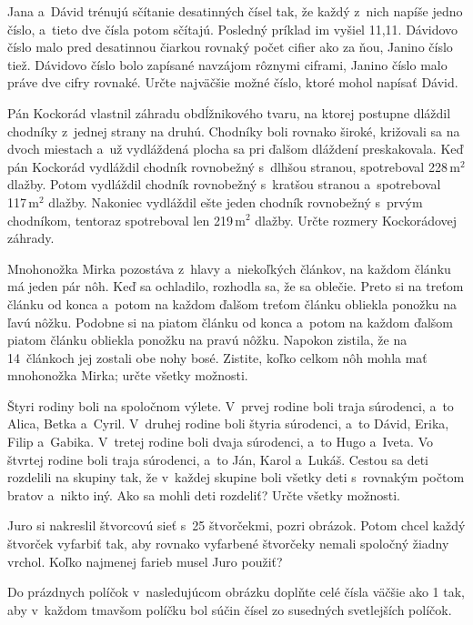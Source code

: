 {%
Jana a~Dávid trénujú sčítanie desatinných čísel tak, že každý z~nich napíše jedno číslo, a~tieto dve čísla potom sčítajú.
Posledný príklad im vyšiel 11{,}11.
Dávidovo číslo malo pred desatinnou čiarkou rovnaký počet cifier ako za ňou, Janino číslo tiež.
Dávidovo číslo bolo zapísané navzájom rôznymi ciframi, Janino číslo malo
práve dve cifry rovnaké.
Určte najväčšie možné číslo, ktoré mohol napísať Dávid.}

{%
Pán Kockorád vlastnil záhradu obdĺžnikového tvaru, na ktorej postupne dláždil chodníky z~jednej strany na druhú.
Chodníky boli rovnako široké, križovali sa na dvoch miestach a~už vydláždená plocha sa pri ďalšom dláždení preskakovala.
Keď pán Kockorád vydláždil chodník rovnobežný s~dlhšou stranou, spotreboval 228\,m$^2$ dlažby.
Potom vydláždil chodník rovnobežný s~kratšou stranou a~spotreboval 117\,m$^2$ dlažby.
Nakoniec vydláždil ešte jeden chodník rovnobežný s~prvým chodníkom, tentoraz spotreboval len 219\,m$^2$ dlažby.
Určte rozmery Kockorádovej záhrady.}

{%
Mnohonožka Mirka pozostáva z~hlavy a~niekoľkých článkov, na každom článku má jeden pár nôh.
Keď sa ochladilo, rozhodla sa, že sa oblečie.
Preto si na treťom článku od konca a~potom na každom ďalšom treťom článku obliekla ponožku na ľavú nôžku.
Podobne si na piatom článku od konca a~potom na každom ďalšom piatom článku obliekla ponožku na pravú nôžku.
Napokon zistila, že na 14~článkoch jej zostali obe nohy bosé.
Zistite, koľko celkom nôh mohla mať mnohonožka Mirka; určte všetky možnosti.
}

{%
Štyri rodiny boli na spoločnom výlete.
V~prvej rodine boli traja súrodenci, a~to Alica, Betka a~Cyril.
V~druhej rodine boli štyria súrodenci, a~to Dávid, Erika, Filip a~Gabika.
V~tretej rodine boli dvaja súrodenci, a~to Hugo a~Iveta.
Vo štvrtej rodine boli traja súrodenci, a~to Ján, Karol a~Lukáš.
Cestou sa deti rozdelili na skupiny tak, že
v~každej skupine boli všetky deti s~rovnakým počtom bratov a~nikto iný.
Ako sa mohli deti rozdeliť?
Určte všetky možnosti.
}

{%
Juro si nakreslil štvorcovú sieť s~25 štvorčekmi, pozri obrázok.
Potom chcel každý štvorček vyfarbiť tak, aby rovnako vyfarbené štvorčeky nemali spoločný žiadny vrchol.
Koľko najmenej farieb musel Juro použiť?
%
}

{%
Do prázdnych políčok v~nasledujúcom obrázku doplňte celé čísla väčšie ako 1 tak, aby v~každom tmavšom políčku bol súčin čísel zo susedných svetlejších políčok.
%
}


